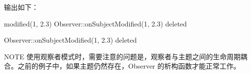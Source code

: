 输出如下：

\begin{shell}
modified(1, 2.3)
Observer::onSubjectModified(1, 2.3)
deleted

Observer::onSubjectModified(1, 2.3)
deleted
\end{shell}

\begin{myNotic}{NOTE}
使用观察者模式时，需要注意的问题是，观察者与主题之间的生命周期耦合。之前的例子中，如果主题仍然存在，Observer 的析构函数才能正常工作。
\end{myNotic}





